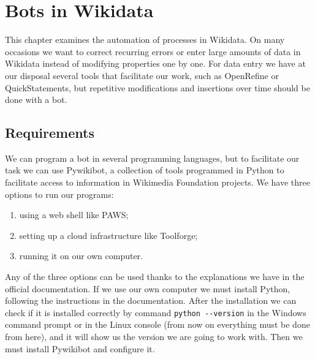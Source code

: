 \label{ch:bots eng}
\chapter{Bots in Wikidata}


This chapter examines the automation of processes in Wikidata. On many occasions we want to correct recurring errors or enter large amounts of data in Wikidata instead of modifying properties one by one. 
For data entry we have at our disposal several tools that facilitate our work, such as OpenRefine %
 or QuickStatements, but repetitive modifications and insertions over time should be done with a bot.


\section{Requirements}%
\label{sec:requirements}
We can program a bot in several programming languages, but to facilitate our task we can use Pywikibot, a collection of tools programmed in Python to facilitate access to information in Wikimedia Foundation projects. We have three options to run our programs:
\begin{enumerate}
  \item using a web shell like PAWS; 
  \item setting up a cloud infrastructure like Toolforge;
  \item running it on our own computer.
\end{enumerate}

Any of the three options can be used 
thanks to the explanations 
we have in the official documentation. 
If we use our own computer we must install Python, following the instructions in the documentation.
After the installation we can check 
if it is installed correctly 
by command \lstinline|python --version| 
in the Windows command prompt or in the Linux console (from now on everything must be done from here), 
and it will show us the version we are going to work with. 
Then we must install Pywikibot and configure it.

